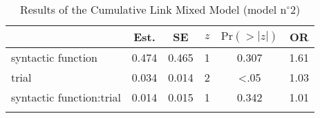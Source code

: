 \begin{table}
\begin{tabular}{l S[table-format=1.3] S[table-format=1.3] c S[table-format=<1.3] S[table-format=1.2]}
  \lsptoprule
 & {Est.} & {SE} & {$z$} & {$\text{Pr}(>|z|)$} & {OR} \\ 
  \midrule
  syntactic function & 0.474 & 0.465 & 1 & 0.307 & 1.61 \\ 
  trial & 0.034 & 0.014 & 2 & <.05 & 1.03 \\ 
  syntactic function:trial & 0.014 & 0.015 & 1 & 0.342 & 1.01 \\ 
   \lspbottomrule
\end{tabular}
\caption{Results of the Cumulative Link Mixed Model (model n$^{\circ}$2)}
\label{tab:exp16-m2}
\end{table}

